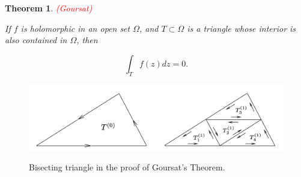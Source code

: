 \documentclass{article}
\newtheorem{theorem}{Theorem}
\begin{document}
\begin{theorem} \textcolor{red}{(Goursat)}

If $f$ is holomorphic in an open set $\Omega$, and $T\subset\Omega$ is a triangle whose interior is also contained in $\Omega$, then

\begin{equation*}
\int_T f(z)dz=0.
\end{equation*}

\end{theorem}

\begin{figure}
\centering
\includegraphics[scale=0.3]{Goursat.png} \\
\caption{Bisecting triangle in the proof of Goursat's Theorem.} 
\label{fig:goursat}
\end{figure}
\end{document}

